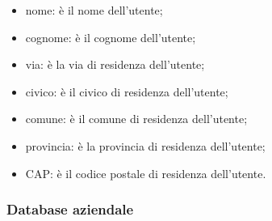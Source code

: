 \documentclass[12pt, a4paper, titlepage]{report}
\begin{document}
\begin{itemize}
\begin{itemize}
			\item nome: è il nome dell'utente;
			\item cognome: è il cognome dell'utente;
			\item via: è la via di residenza dell'utente;
			\item civico: è il civico di residenza dell'utente;
			\item comune: è il comune di residenza dell'utente;
			\item provincia: è la provincia di residenza dell'utente;
			\item CAP: è il codice postale di residenza dell'utente.
		\end{itemize}
	\end{itemize}
	
	\subsubsection{Database aziendale}
	
\end{document}
